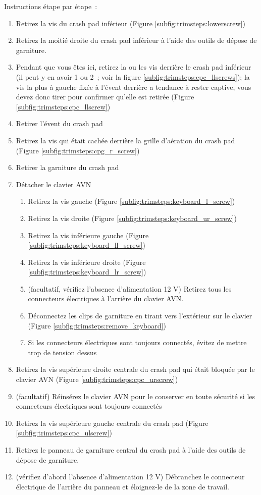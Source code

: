 \documentclass[superscriptaddress,onecolumn,floatfix]{revtex4-2}
\begin{document}
Instructions étape par étape :
\begin{enumerate}
  \item Retirez la vis du crash pad inférieur (Figure \ref{subfig:trimsteps:lowerscrew})
  \item Retirez la moitié droite du crash pad inférieur à l'aide des outils de dépose de garniture.
  \item Pendant que vous êtes ici, retirez la ou les vis derrière le crash pad inférieur (il peut y en avoir 1 ou 2 ; voir la figure \ref{subfig:trimsteps:cpc_llscrews}); la vis la plus à gauche fixée à l'évent derrière a tendance à rester captive, vous devez donc tirer pour confirmer qu'elle est retirée (Figure \ref{subfig:trimsteps:cpc_llscrew})
  \item Retirer l'évent du crash pad
  \item Retirez la vis qui était cachée derrière la grille d'aération du crash pad (Figure \ref{subfig:trimsteps:cpg_r_screw})
  \item Retirer la garniture du crash pad
  \item Détacher le clavier AVN 
    \begin{enumerate}
      \item Retirez la vis gauche (Figure \ref{subfig:trimsteps:keyboard_l_screw})
      \item Retirez la vis droite (Figure \ref{subfig:trimsteps:keyboard_ur_screw})
      \item Retirez la vis inférieure gauche (Figure \ref{subfig:trimsteps:keyboard_ll_screw})
      \item Retirez la vis inférieure droite (Figure \ref{subfig:trimsteps:keyboard_lr_screw})
      \item (facultatif, vérifiez l'absence d'alimentation 12 V) Retirez tous les connecteurs électriques à l'arrière du clavier AVN.
      \item Déconnectez les clips de garniture en tirant vers l'extérieur sur le clavier (Figure \ref{subfig:trimsteps:remove_keyboard})
      \item Si les connecteurs électriques sont toujours connectés, évitez de mettre trop de tension dessus
    \end{enumerate}
  \item Retirez la vis supérieure droite centrale du crash pad qui était bloquée par le clavier AVN (Figure \ref{subfig:trimsteps:cpc_urscrew})
  \item (facultatif) Réinsérez le clavier AVN pour le conserver en toute sécurité si les connecteurs électriques sont toujours connectés
  \item Retirez la vis supérieure gauche centrale du crash pad (Figure \ref{subfig:trimsteps:cpc_ulscrew})
  \item Retirez le panneau de garniture central du crash pad à l'aide des outils de dépose de garniture.
  \item (vérifiez d'abord l'absence d'alimentation 12 V) Débranchez le connecteur électrique de l'arrière du panneau et éloignez-le de la zone de travail.
\end{enumerate}
\end{document}
